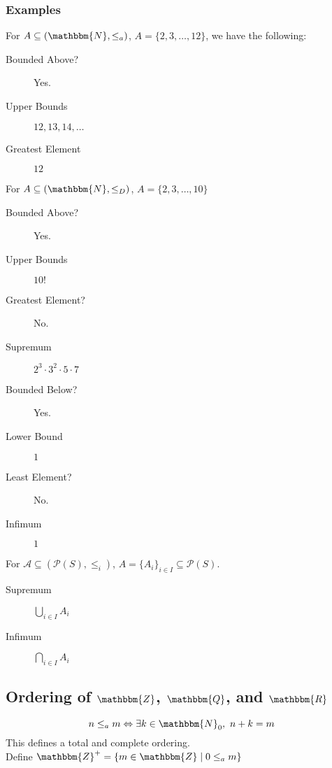 \documentclass[10pt]{extarticle}
\newcommand{\N}{\mathbbm{N}}
\newcommand{\Q}{\mathbbm{Q}}
\newcommand{\Z}{\mathbbm{Z}}
\newcommand{\R}{\mathbbm{R}}
\begin{document}
        \subsubsection{Examples}%
          For $A\subseteq (\N,\leq_a)$, $A = \{2,3,\dots,12\}$, we have the following:
          \begin{description}
            \item[Bounded Above?] Yes.
            \item[Upper Bounds] $12,13,14,\dots$
            \item[Greatest Element] $12$
          \end{description}
          For $A\subseteq (\N,\leq_D)$, $A = \{2,3,\dots,10\}$
          \begin{description}
            \item[Bounded Above?] Yes.
            \item[Upper Bounds] $10!$
            \item[Greatest Element?] No.
            \item[Supremum] $2^3\cdot3^2\cdot5\cdot7$
            \item[Bounded Below?] Yes.
            \item[Lower Bound] $1$
            \item[Least Element?] No.
            \item[Infimum] $1$
          \end{description}
          For $\mathcal{A}\subseteq (\mathcal{P}(S),\leq_i)$, $A = \{A_i\}_{i\in I} \subseteq \mathcal{P}(S)$.
          \begin{description}
            \item[Supremum] $\bigcup_{i\in I}A_i$
            \item[Infimum] $\bigcap_{i\in I}A_i$
          \end{description}
    \subsection{Ordering of $\Z$, $\Q$, and $\R$}%
    
    \[
      n\leq_a m \Leftrightarrow \exists k\in \N_0,~n+k=m
    \] 
    This defines a total and complete ordering.\\

    Define $\Z^+ = \{m\in \Z\mid 0\leq_a m\}$\\
\end{document}
